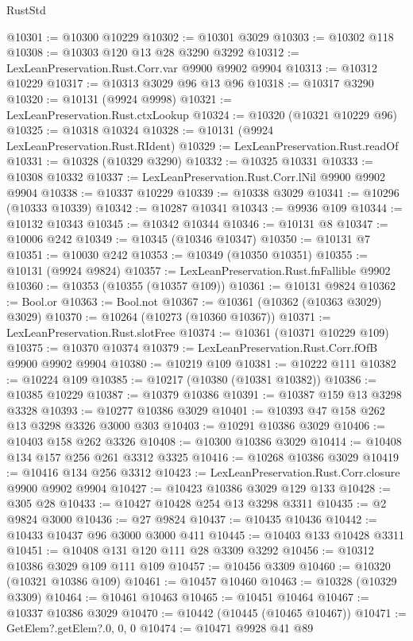 \begin{lexlean}{RustStd}
\begin{coremodule}
@10301 := @10300 @10229
@10302 := @10301 @3029
@10303 := @10302 @118
@10308 := @10303 @120 @13 @28 @3290 @3292
@10312 := LexLeanPreservation.Rust.Corr.var @9900 @9902 @9904
@10313 := @10312 @10229
@10317 := @10313 @3029 @96 @13 @96
@10318 := @10317 @3290
@10320 := @10131 (@9924 @9998)
@10321 := LexLeanPreservation.Rust.ctxLookup
@10324 := @10320 (@10321 @10229 @96)
@10325 := @10318 @10324
@10328 := @10131 (@9924 LexLeanPreservation.Rust.RIdent)
@10329 := LexLeanPreservation.Rust.readOf
@10331 := @10328 (@10329 @3290)
@10332 := @10325 @10331
@10333 := @10308 @10332
@10337 := LexLeanPreservation.Rust.Corr.lNil @9900 @9902 @9904
@10338 := @10337 @10229
@10339 := @10338 @3029
@10341 := @10296 (@10333 @10339)
@10342 := @10287 @10341
@10343 := @9936 @109
@10344 := @10132 @10343
@10345 := @10342 @10344
@10346 := @10131 @8
@10347 := @10006 @242
@10349 := @10345 (@10346 @10347)
@10350 := @10131 @7
@10351 := @10030 @242
@10353 := @10349 (@10350 @10351)
@10355 := @10131 (@9924 @9824)
@10357 := LexLeanPreservation.Rust.fnFallible @9902
@10360 := @10353 (@10355 (@10357 @109))
@10361 := @10131 @9824
@10362 := Bool.or
@10363 := Bool.not
@10367 := @10361 (@10362 (@10363 @3029) @3029)
@10370 := @10264 (@10273 (@10360 @10367))
@10371 := LexLeanPreservation.Rust.slotFree
@10374 := @10361 (@10371 @10229 @109)
@10375 := @10370 @10374
@10379 := LexLeanPreservation.Rust.Corr.fOfB @9900 @9902 @9904
@10380 := @10219 @109
@10381 := @10222 @111
@10382 := @10224 @109
@10385 := @10217 (@10380 (@10381 @10382))
@10386 := @10385 @10229
@10387 := @10379 @10386
@10391 := @10387 @159 @13 @3298 @3328
@10393 := @10277 @10386 @3029
@10401 := @10393 @47 @158 @262 @13 @3298 @3326 @3000 @303
@10403 := @10291 @10386 @3029
@10406 := @10403 @158 @262 @3326
@10408 := @10300 @10386 @3029
@10414 := @10408 @134 @157 @256 @261 @3312 @3325
@10416 := @10268 @10386 @3029
@10419 := @10416 @134 @256 @3312
@10423 := LexLeanPreservation.Rust.Corr.closure @9900 @9902 @9904
@10427 := @10423 @10386 @3029 @129 @133
@10428 := @305 @28
@10433 := @10427 @10428 @254 @13 @3298 @3311
@10435 := @2 @9824 @3000
@10436 := @27 @9824
@10437 := @10435 @10436
@10442 := @10433 @10437 @96 @3000 @3000 @411
@10445 := @10403 @133 @10428 @3311
@10451 := @10408 @131 @120 @111 @28 @3309 @3292
@10456 := @10312 @10386 @3029 @109 @111 @109
@10457 := @10456 @3309
@10460 := @10320 (@10321 @10386 @109)
@10461 := @10457 @10460
@10463 := @10328 (@10329 @3309)
@10464 := @10461 @10463
@10465 := @10451 @10464
@10467 := @10337 @10386 @3029
@10470 := @10442 (@10445 (@10465 @10467))
@10471 := GetElem?.getElem?.{0, 0, 0}
@10474 := @10471 @9928 @41 @89

\end{coremodule}
\end{lexlean}
